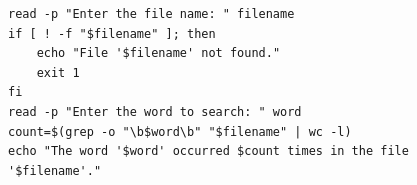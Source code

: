 \begin{verbatim}
read -p "Enter the file name: " filename
if [ ! -f "$filename" ]; then
    echo "File '$filename' not found."
    exit 1
fi
read -p "Enter the word to search: " word
count=$(grep -o "\b$word\b" "$filename" | wc -l)
echo "The word '$word' occurred $count times in the file
'$filename'."
\end{verbatim}